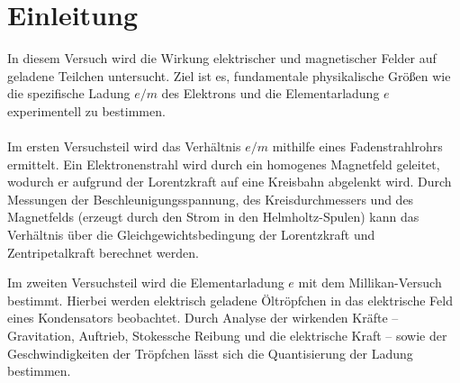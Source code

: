 \section{Einleitung}
In diesem Versuch wird die Wirkung elektrischer und magnetischer Felder auf geladene Teilchen untersucht. Ziel ist es, fundamentale physikalische Größen wie die spezifische Ladung $e/m$ des Elektrons und die Elementarladung $e$ experimentell zu bestimmen.  

\paragraph{}
Im ersten Versuchsteil wird das Verhältnis $e/m$ mithilfe eines Fadenstrahlrohrs ermittelt. Ein Elektronenstrahl wird durch ein homogenes Magnetfeld geleitet, wodurch er aufgrund der Lorentzkraft auf eine Kreisbahn abgelenkt wird. Durch Messungen der Beschleunigungsspannung, des Kreisdurchmessers und des Magnetfelds (erzeugt durch den Strom in den Helmholtz-Spulen) kann das Verhältnis über die Gleichgewichtsbedingung der Lorentzkraft und Zentripetalkraft berechnet werden.

Im zweiten Versuchsteil wird die Elementarladung $e$ mit dem Millikan-Versuch bestimmt. Hierbei werden elektrisch geladene Öltröpfchen in das elektrische Feld eines Kondensators beobachtet. Durch Analyse der wirkenden Kräfte – Gravitation, Auftrieb, Stokessche Reibung und die elektrische Kraft – sowie der Geschwindigkeiten der Tröpfchen lässt sich die Quantisierung der Ladung bestimmen.